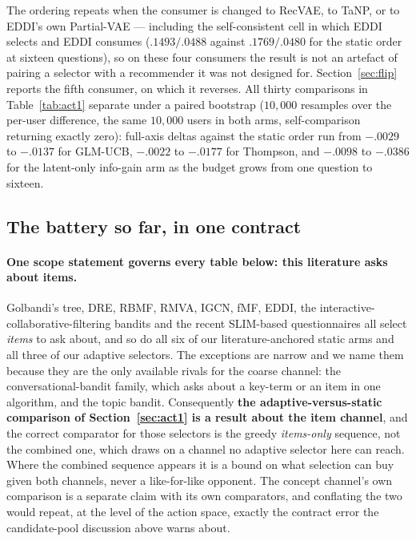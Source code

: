 \documentclass[11pt]{article}
\begin{document}
The ordering repeats when the consumer is changed to RecVAE, to TaNP, or to EDDI's own Partial-VAE
--- including the self-consistent cell in which EDDI selects and EDDI consumes ($.1493/.0488$
against $.1769/.0480$ for the static order at sixteen questions), so on these four consumers the
result is not an artefact of pairing a selector with a recommender it was not designed for.
Section~\ref{sec:flip} reports the fifth consumer, on which it reverses.
All thirty comparisons in Table~\ref{tab:act1} separate under a paired bootstrap ($10{,}000$
resamples over the per-user difference, the same $10{,}000$ users in both arms, self-comparison
returning exactly zero): full-axis deltas against the static order run from $-.0029$ to $-.0137$
for GLM-UCB, $-.0022$ to $-.0177$ for Thompson, and $-.0098$ to $-.0386$ for the latent-only
info-gain arm as the budget grows from one question to sixteen.

\subsection{The battery so far, in one contract}
\label{sec:battery}

\paragraph{One scope statement governs every table below: this literature asks about items.}
Golbandi's tree, DRE, RBMF, RMVA, IGCN, fMF, EDDI, the interactive-collaborative-filtering bandits
and the recent SLIM-based questionnaires all select \emph{items} to ask about, and so do all six of
our literature-anchored static arms and all three of our adaptive selectors. The exceptions are
narrow and we name them because they are the only available rivals for the coarse channel: the
conversational-bandit family, which asks about a key-term or an item in one algorithm, and the
topic bandit. Consequently \textbf{the adaptive-versus-static comparison of Section~\ref{sec:act1} is a result about
the item channel}, and the correct comparator for those selectors is the greedy \emph{items-only}
sequence, not the combined one, which draws on a channel no adaptive selector here can reach. Where
the combined sequence appears it is a bound on what selection can buy given both channels, never a
like-for-like opponent. The concept channel's own comparison is a separate claim with its own
comparators, and conflating the two would repeat, at the level of the action space, exactly the
contract error the candidate-pool discussion above warns about.
\end{document}
